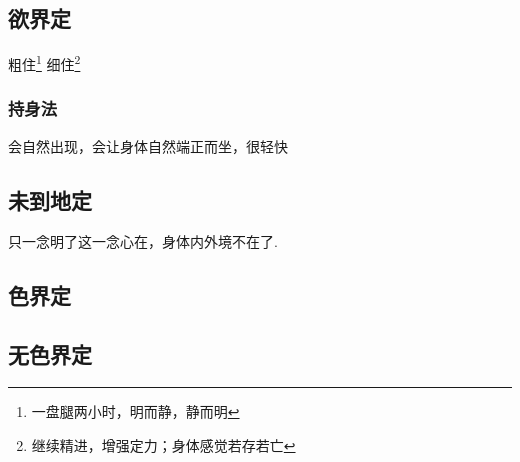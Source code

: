 \subsection{欲界定}
粗住\footnote{一盘腿两小时，明而静，静而明}
细住\footnote{继续精进，增强定力；身体感觉若存若亡}
\subsubsection{持身法}
会自然出现，会让身体自然端正而坐，很轻快


\subsection{未到地定}
只一念明了这一念心在，身体内外境不在了. 

\subsection{色界定}
\subsection{无色界定}
